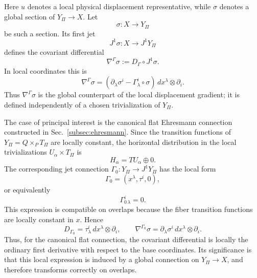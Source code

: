 \documentclass[11pt]{amsart}
\theoremstyle{plain}
\theoremstyle{definition}
\theoremstyle{remark}
\begin{document}
Here \(u\) denotes a local physical displacement representative, while \(\sigma\) denotes a global section of \(Y_\Pi\to X\). 
Let
\[
\sigma:X\to Y_\Pi
\]
be such a section. 
Its first jet
\begin{equation}
	J^1\sigma:X\to J^1Y_\Pi
	\label{eq:first_jet_sigma}
\end{equation}
defines the covariant differential
\begin{equation}
	\nabla^\Gamma\sigma
	:=
	D_\Gamma\circ J^1\sigma.
	\label{eq:covariant}
\end{equation}
In local coordinates this is
\begin{equation}
	\nabla^\Gamma\sigma
	=
	(\partial_\lambda \sigma^i
	-
	\Gamma^i_\lambda\circ \sigma)\,
	dx^\lambda\otimes \partial_i.
	\label{eq:covariant_local}
\end{equation}
Thus \(\nabla^\Gamma\sigma\) is the global counterpart of the local displacement gradient; it is defined independently of a chosen trivialization of \(Y_\Pi\).

\medskip

The case of principal interest is the canonical flat Ehresmann connection constructed in Sec.~\ref{subsec:ehresmann}. 
Since the transition functions of \(Y_\Pi=Q\times_P T_\Pi\) are locally constant, the horizontal distribution in the local trivializations \(U_\alpha\times T_\Pi\) is
\[
H_\alpha = TU_\alpha\oplus 0.
\]
The corresponding jet connection \(\Gamma_0:Y_\Pi\to J^1Y_\Pi\) has the local form
\begin{equation}
	\Gamma_0
	=
	(x^\lambda,\tau^i,0),
	\label{eq:flat_connection_coordinates}
\end{equation}
or equivalently
\[
\Gamma_{0\,\lambda}^i=0.
\]
This expression is compatible on overlaps because the fiber transition functions are locally constant in \(x\). Hence
\begin{equation}
	D_{\Gamma_0}
	=
	\tau^i_\lambda\,dx^\lambda\otimes \partial_i,
	\qquad
	\nabla^{\Gamma_0}\sigma
	=
	\partial_\lambda \sigma^i\,
	dx^\lambda\otimes \partial_i.
	\label{eq:flat_covariant_differential}
\end{equation}
Thus, for the canonical flat connection, the covariant differential is locally the ordinary first derivative with respect to the base coordinates. 
Its significance is that this local expression is induced by a global connection on \(Y_\Pi\to X\), and therefore transforms correctly on overlaps.

\medskip
\end{document}
